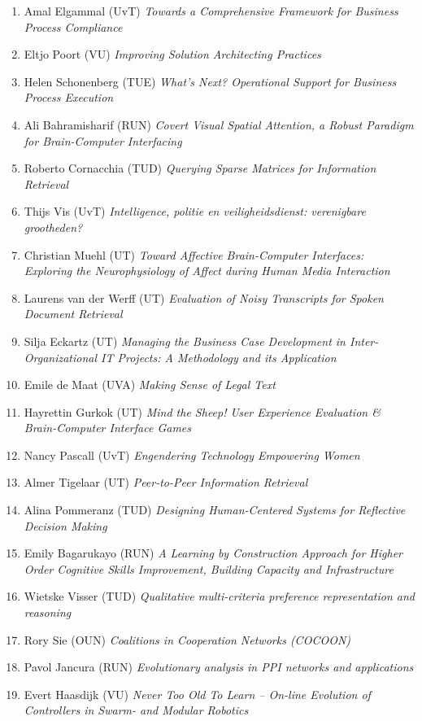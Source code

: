 \begin{multicols}{2}
\begin{scriptsize}
\begin{enumerate}[leftmargin=*,noitemsep,topsep=0pt,parsep=1pt,partopsep=0pt]
{}\item Amal Elgammal (UvT) \textit{Towards a Comprehensive Framework for Business Process Compliance
}\item Eltjo Poort (VU) \textit{Improving Solution Architecting Practices
}\item Helen Schonenberg (TUE) \textit{What's Next? Operational Support for Business Process Execution
}\item Ali Bahramisharif (RUN) \textit{Covert Visual Spatial Attention, a Robust Paradigm for Brain-Computer Interfacing
}\item Roberto Cornacchia (TUD) \textit{Querying Sparse Matrices for Information Retrieval
}\item Thijs Vis (UvT) \textit{Intelligence, politie en veiligheidsdienst: verenigbare grootheden? 
}\item Christian Muehl (UT) \textit{Toward Affective Brain-Computer Interfaces: Exploring the Neurophysiology of Affect during Human Media Interaction
}\item Laurens van der Werff (UT) \textit{Evaluation of Noisy Transcripts for Spoken Document Retrieval
}\item Silja Eckartz (UT) \textit{Managing the Business Case Development in Inter-Organizational IT Projects: A Methodology and its Application 
}\item Emile de Maat (UVA) \textit{Making Sense of Legal Text 
}\item Hayrettin Gurkok (UT) \textit{Mind the Sheep! User Experience Evaluation \& Brain-Computer Interface Games
}\item Nancy Pascall (UvT) \textit{Engendering Technology Empowering Women 
}\item Almer Tigelaar (UT) \textit{Peer-to-Peer Information Retrieval
}\item Alina Pommeranz (TUD) \textit{Designing Human-Centered Systems for Reflective Decision Making
}\item Emily Bagarukayo (RUN) \textit{A Learning by Construction Approach for Higher Order Cognitive Skills Improvement, Building Capacity and Infrastructure
}\item Wietske Visser (TUD) \textit{Qualitative multi-criteria preference representation and reasoning 
}\item Rory Sie (OUN) \textit{Coalitions in Cooperation Networks (COCOON)
}\item Pavol Jancura (RUN) \textit{Evolutionary analysis in PPI networks and applications 
}\item Evert Haasdijk (VU) \textit{Never Too Old To Learn -- On-line Evolution of Controllers in Swarm- and Modular Robotics
}
\end{enumerate}
\end{scriptsize}
\end{multicols}
